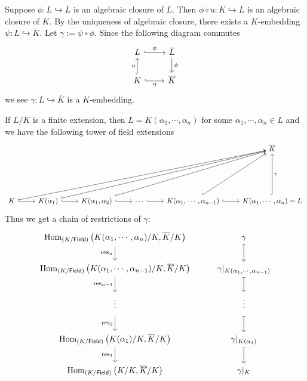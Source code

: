 \begin{prf}
    Suppose $\phi:L\hookrightarrow \overline{L}$ is an algebraic closure of $L$. Then $\phi\circ u: K\hookrightarrow \overline{L}$ is an algebraic closure of $K$. By the uniqueness of algebraic closure, there exists a $K$-embedding $\psi:L\hookrightarrow \overline{K}$. Let $\gamma:=\psi\circ \phi$. Since the following diagram commutes
    \[
        \begin{tikzcd}
            L \arrow[r, "\phi", hook]                       & \overline{L} \arrow[d, "\psi"] \\
            K \arrow[u, "u", hook] \arrow[r, "\eta"', hook] & \overline{K}                  
            \end{tikzcd}
    \]
    we see $\gamma:L\hookrightarrow \overline{K}$ is a $K$-embedding.

    If $L/K$ is a finite extension, then $L=K(\alpha_1,\cdots,\alpha_n)$ for some $\alpha_1,\cdots,\alpha_n\in L$ and we have the following tower of field extensions
    \[
        \begin{tikzcd}
            &                                                 &                                                           &                        &                                                                    & \overline{K}                                    \\[+4em]
K \arrow[r, hook] \arrow[rrrrru, hook] & K(\alpha_1) \arrow[r, hook] \arrow[rrrru, hook] & {K(\alpha_1,\alpha_2)} \arrow[r, hook] \arrow[rrru, hook] & \cdots \arrow[r, hook] & {K(\alpha_1,\cdots,\alpha_{n-1})} \arrow[r, hook] \arrow[ru, hook] & {K(\alpha_1,\cdots,\alpha_n)=L} \arrow[u, "\gamma"', hook]
\end{tikzcd}
    \]
    Thus we get a chain of restrictions of $\gamma$:
    \[
        \begin{tikzcd}
            {\mathrm{Hom}_{(K/\mathsf{Field})}\left(K(\alpha_1,\cdots,\alpha_n)/K,\overline{K}/K\right)} \arrow[d, "\mathrm{res}_n"']         & \gamma \arrow[d, maps to]                                      \\
            {\mathrm{Hom}_{(K/\mathsf{Field})}\left(K(\alpha_1,\cdots,\alpha_{n-1})/K,\overline{K}/K\right)} \arrow[d, "\mathrm{res}_{n-1}"'] & {\gamma|_{K(\alpha_1,\cdots,\alpha_{n-1})}} \arrow[d, maps to] \\
            {\raisebox{1.5ex}{$\vdots$}}  \arrow[d, "\mathrm{res}_{2}"']                                                                                                 & {\raisebox{1.5ex}{$\vdots$}}  \arrow[d,maps to]                                      \\
            {\mathrm{Hom}_{(K/\mathsf{Field})}\left(K(\alpha_1)/K,\overline{K}/K\right)} \arrow[d, "\mathrm{res}_1"']                         & \gamma|_{K(\alpha_1)} \arrow[d, maps to]                       \\
            {\mathrm{Hom}_{(K/\mathsf{Field})}\left(K/K,\overline{K}/K\right)}                                                                & \gamma|_{K}                                                   
            \end{tikzcd}
    \]
\end{prf}

